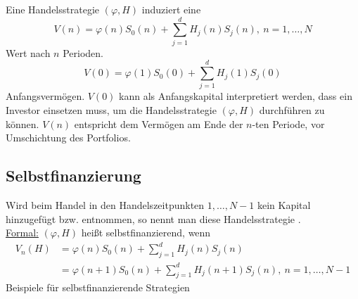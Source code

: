 Eine Handelsstrategie $(\varphi,H)$ induziert eine 
\[
V(n)=\varphi(n)S_0(n)+\sum_{j=1}^{d}H_j(n)S_j(n),~n=1,\dots,N
\]
Wert nach $n$ Perioden.
\[
	V(0)=\varphi(1)S_0(0)+\sum_{j=1}^{d}H_j(1)S_j(0)
\]
Anfangsvermögen. $V(0)$ kann als Anfangskapital interpretiert werden, dass ein Investor einsetzen muss, um die Handelsstrategie $(\varphi,H)$ durchführen zu können. $V(n)$ entspricht dem Vermögen am Ende der $n$-ten Periode, vor Umschichtung des Portfolios.


\subsection{Selbstfinanzierung}
\label{sub:selbstfinanzierung}
Wird beim Handel in den Handelszeitpunkten $1,\dots,N-1$ kein Kapital hinzugefügt bzw. entnommen, so nennt man diese Handelsstrategie .\\
\uline{Formal:} $(\varphi,H)$ heißt selbstfinanzierend, wenn
\begin{equation*}
\begin{aligned}
	V_n(H)&=\varphi(n)S_0(n)+\sum_{j=1}^{d}H_j(n)S_j(n)\\
	&=\varphi(n+1)S_0(n)+\sum_{j=1}^{d}H_j(n+1)S_j(n),~n=1,\dots,N-1
\end{aligned}
\end{equation*}
Beispiele für selbstfinanzierende Strategien

